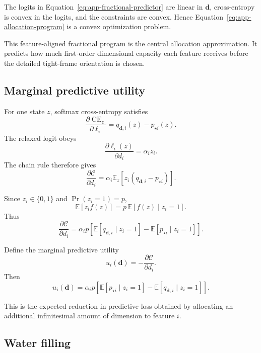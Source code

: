 The logits in Equation~\eqref{eq:app-fractional-predictor} are linear in
\(\mathbf d\), cross-entropy is convex in the logits, and the constraints are convex.
Hence Equation~\eqref{eq:app-allocation-program} is a convex optimization problem.

This feature-aligned fractional program is the central allocation approximation. It
predicts how much first-order dimensional capacity each feature receives before the
detailed tight-frame orientation is chosen.

\subsection{Marginal predictive utility}

For one state \(z\), softmax cross-entropy satisfies
\[
\frac{\partial\operatorname{CE}_z}{\partial\ell_i}
=
q_{\mathbf d,i}(z)-p_{\star i}(z).
\]
The relaxed logit obeys
\[
\frac{\partial\ell_i(z)}{\partial d_i}
=
\alpha_i z_i.
\]
The chain rule therefore gives
\[
\frac{\partial\mathcal C}{\partial d_i}
=
\alpha_i
\mathbb E_z
\left[
z_i
\left(
q_{\mathbf d,i}-p_{\star i}
\right)
\right].
\]

Since \(z_i\in\{0,1\}\) and \(\Pr(z_i=1)=p\),
\[
\mathbb E[z_if(z)]
=
p\,\mathbb E[f(z)\mid z_i=1].
\]
Thus
\begin{equation}
\frac{\partial\mathcal C}{\partial d_i}
=
\alpha_i p
\left[
\mathbb E[q_{\mathbf d,i}\mid z_i=1]
-
\mathbb E[p_{\star i}\mid z_i=1]
\right].
\label{eq:app-allocation-gradient}
\end{equation}

Define the marginal predictive utility
\begin{equation}
\boxed{
u_i(\mathbf d)
=
-
\frac{\partial\mathcal C}{\partial d_i}.
}
\label{eq:app-utility-definition}
\end{equation}
Then
\begin{equation}
\boxed{
u_i(\mathbf d)
=
\alpha_i p
\left[
\mathbb E[p_{\star i}\mid z_i=1]
-
\mathbb E[q_{\mathbf d,i}\mid z_i=1]
\right].
}
\label{eq:app-utility}
\end{equation}

This is the expected reduction in predictive loss obtained by allocating an
additional infinitesimal amount of dimension to feature \(i\).

\subsection{Water filling}

